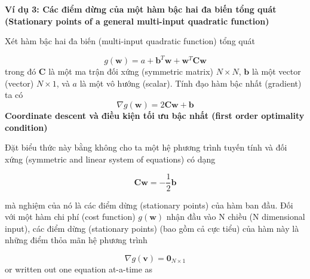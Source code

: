 \documentclass{book}
\begin{document}
\textbf{Ví dụ 3: Các điểm dừng của một hàm bậc hai đa biến tổng quát (Stationary points of a general multi-input quadratic function)}

Xét hàm bậc hai đa biến (multi-input quadratic function) tổng quát

\begin{equation}
    g\left(\mathbf{w}\right)=a + \mathbf{b}^{T}\mathbf{w} + \mathbf{w}^{T}\mathbf{C}\mathbf{w}
\end{equation}
trong đó $\mathbf{C}$ là một ma trận đối xứng (symmetric matrix) $N\times N$, $\mathbf{b}$ là một vector (vector) $N\times 1$, và $a$ là một vô hướng (scalar).
Tính đạo hàm bậc nhất (gradient) ta có
\begin{equation}
    \nabla g\left(\mathbf{w}\right)=2\mathbf{C}\mathbf{w}+\mathbf{b}
\end{equation}
\textbf{Coordinate descent và điều kiện tối ưu bậc nhất (first order optimality condition)}

Đặt biểu thức này bằng không cho ta một hệ phương trình tuyến tính và đối xứng (symmetric and linear system of equations) có dạng

\begin{equation}
    \mathbf{C}\mathbf{w}=-\frac{1}{2}\mathbf{b}
\end{equation}

mà nghiệm của nó là các điểm dừng (stationary points) của hàm ban đầu.
Đối với một hàm chi phí (cost function) $g\left(\mathbf{w}\right)$ nhận đầu vào N chiều (N dimensional input), các điểm dừng (stationary points) (bao gồm cả cực tiểu) của hàm này là những điểm thỏa mãn hệ phương trình

\begin{equation*}
    \nabla g\left(\mathbf{v}\right)=\mathbf{0}_{N\times1}
\end{equation*}
or written out one equation at-a-time as
\end{document}
